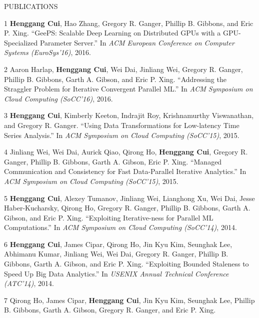 \documentclass{resume} %
\begin{document}
\begin{rSection}{PUBLICATIONS}
\vspace{-.1in}
\small{
    \item
    [1]
        {\bf Henggang Cui}, Hao Zhang, Gregory R. Ganger, Phillip B. Gibbons, and Eric P. Xing.
        ``GeePS: Scalable Deep Learning on Distributed GPUs with a GPU-Specialized Parameter Server.''
        In \emph{ACM European Conference on Computer Systems (EuroSys'16)}, 2016.
    \item
    [2]
        Aaron Harlap, {\bf Henggang Cui}, Wei Dai, Jinliang Wei, Gregory R. Ganger, Phillip B. Gibbons, Garth A. Gibson, and Eric P. Xing.
        ``Addressing the Straggler Problem for Iterative Convergent Parallel ML.''
        In \emph{ACM Symposium on Cloud Computing (SoCC'16)}, 2016.
    \item
    [3]
        {\bf Henggang Cui}, Kimberly Keeton, Indrajit Roy, Krishnamurthy Viswanathan, and Gregory R. Ganger.
        ``Using Data Transformations for Low-latency Time Series Analysis.''
        In \emph{ACM Symposium on Cloud Computing (SoCC'15)}, 2015.
    \item
    [4]
        Jinliang Wei, Wei Dai, Aurick Qiao, Qirong Ho, {\bf Henggang Cui}, Gregory R. Ganger, Phillip B. Gibbons, Garth A. Gibson, Eric P. Xing.
        ``Managed Communication and Consistency for Fast Data-Parallel Iterative Analytics.''
        In \emph{ACM Symposium on Cloud Computing (SoCC'15)}, 2015.
    \item
    [5]
        {\bf Henggang Cui}, Alexey Tumanov, Jinliang Wei, Lianghong Xu, Wei Dai, Jesse Haber-Kucharsky, Qirong Ho, Gregory R. Ganger, Phillip B. Gibbons, Garth A. Gibson, and Eric P. Xing.
        ``Exploiting Iterative-ness for Parallel ML Computations.''
        In \emph{ACM Symposium on Cloud Computing (SoCC'14)}, 2014.
    \item
    [6]
        {\bf Henggang Cui}, James Cipar, Qirong Ho, Jin Kyu Kim, Seunghak Lee, Abhimanu Kumar, Jinliang Wei, Wei Dai, Gregory R. Ganger, Phillip B. Gibbons, Garth A. Gibson, and Eric P. Xing.
        ``Exploiting Bounded Staleness to Speed Up Big Data Analytics.''
        In \emph{USENIX Annual Technical Conference (ATC'14)}, 2014.
    \item
    [7]
        Qirong Ho, James Cipar, {\bf Henggang Cui}, Jin Kyu Kim, Seunghak Lee, Phillip B. Gibbons, Garth A. Gibson, Gregory R. Ganger, and Eric P. Xing.
}
\end{rSection}
\end{document}
